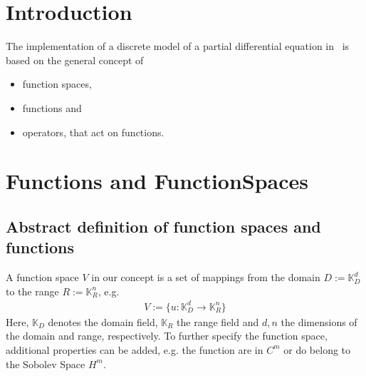 \chapter{Introduction}

  The implementation of a discrete model of a partial differential equation in \Fem\ is based on the
  general concept of
    \begin{itemize}
    \item function spaces, 
    \item functions and
    \item operators, that act on functions.
  \end{itemize}


\chapter{Functions and FunctionSpaces}


\section{Abstract definition of function spaces and functions}

  A function space $V$ in our concept is a set of mappings from the domain $D:=\mathbb{K}_D^d$ to the range $R:=\mathbb{K}_R^n$, e.g.
  \begin{eqnarray}
    V := \{ u : \mathbb{K}_D^d \to \mathbb{K}_R^n \} \nonumber 
  \end{eqnarray}
  Here, $\mathbb{K}_D$ denotes the domain field, $\mathbb{K}_R$ the range field and  $d,n$ the dimensions of the domain and range, respectively. To further specify the function space, additional properties can be added, e.g. the function are in $C^m$ or do belong to the Sobolev Space $H^m$.     

